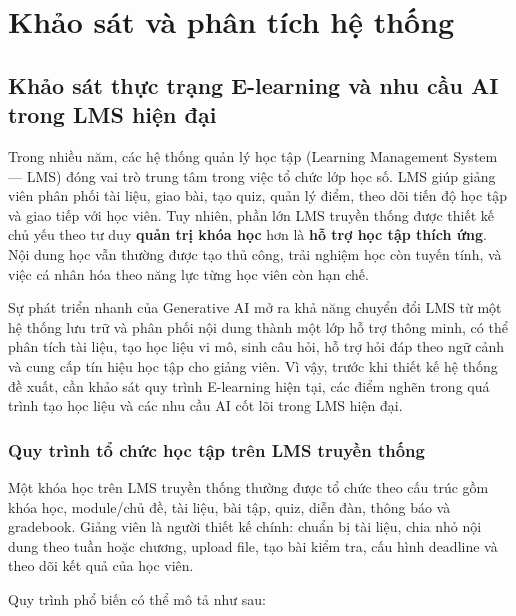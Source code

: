 \chapter{Khảo sát và phân tích hệ thống}
\label{chap:khao-sat-phan-tich-he-thong}

\section{Khảo sát thực trạng E-learning và nhu cầu AI trong LMS hiện đại}
\label{sec:khao-sat-thuc-trang-elearning}

Trong nhiều năm, các hệ thống quản lý học tập (Learning Management System ---
LMS) đóng vai trò trung tâm trong việc tổ chức lớp học số. LMS giúp giảng viên
phân phối tài liệu, giao bài, tạo quiz, quản lý điểm, theo dõi tiến độ học tập
và giao tiếp với học viên. Tuy nhiên, phần lớn LMS truyền thống được thiết kế
chủ yếu theo tư duy \textbf{quản trị khóa học} hơn là \textbf{hỗ trợ học tập
thích ứng}. Nội dung học vẫn thường được tạo thủ công, trải nghiệm học còn
tuyến tính, và việc cá nhân hóa theo năng lực từng học viên còn hạn chế.

Sự phát triển nhanh của Generative AI mở ra khả năng chuyển đổi LMS từ một hệ
thống lưu trữ và phân phối nội dung thành một lớp hỗ trợ thông minh, có thể
phân tích tài liệu, tạo học liệu vi mô, sinh câu hỏi, hỗ trợ hỏi đáp theo ngữ
cảnh và cung cấp tín hiệu học tập cho giảng viên. Vì vậy, trước khi thiết kế hệ
thống đề xuất, cần khảo sát quy trình E-learning hiện tại, các điểm nghẽn trong
quá trình tạo học liệu và các nhu cầu AI cốt lõi trong LMS hiện đại.

\subsection{Quy trình tổ chức học tập trên LMS truyền thống}

Một khóa học trên LMS truyền thống thường được tổ chức theo cấu trúc gồm khóa
học, module/chủ đề, tài liệu, bài tập, quiz, diễn đàn, thông báo và gradebook.
Giảng viên là người thiết kế chính: chuẩn bị tài liệu, chia nhỏ nội dung theo
tuần hoặc chương, upload file, tạo bài kiểm tra, cấu hình deadline và theo dõi
kết quả của học viên.

Quy trình phổ biến có thể mô tả như sau:

